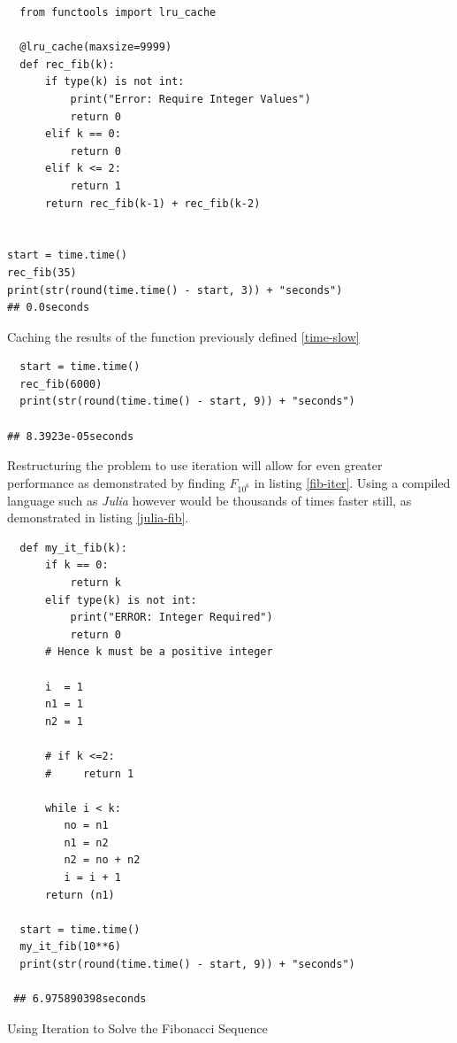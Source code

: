 \documentclass[11pt]{article}
\begin{document}
\begin{listing}[htbp]
\begin{verbatim}
  from functools import lru_cache

  @lru_cache(maxsize=9999)
  def rec_fib(k):
      if type(k) is not int:
          print("Error: Require Integer Values")
          return 0
      elif k == 0:
          return 0
      elif k <= 2:
          return 1
      return rec_fib(k-1) + rec_fib(k-2)


start = time.time()
rec_fib(35)
print(str(round(time.time() - start, 3)) + "seconds")
## 0.0seconds
\end{verbatim}
\caption{\label{fib-cache}Caching the results of the function previously defined \ref{time-slow}}
\end{listing}

\begin{verbatim}
  start = time.time()
  rec_fib(6000)
  print(str(round(time.time() - start, 9)) + "seconds")

## 8.3923e-05seconds
\end{verbatim}

Restructuring the problem to use iteration will allow for even greater performance as demonstrated by finding \(F_{10^{6}}\) in listing \ref{fib-iter}. Using a compiled language such as \emph{Julia} however would be thousands of times faster still, as demonstrated in listing \ref{julia-fib}.



\begin{listing}[htbp]
\begin{verbatim}
  def my_it_fib(k):
      if k == 0:
          return k
      elif type(k) is not int:
          print("ERROR: Integer Required")
          return 0
      # Hence k must be a positive integer

      i  = 1
      n1 = 1
      n2 = 1

      # if k <=2:
      #     return 1

      while i < k:
         no = n1
         n1 = n2
         n2 = no + n2
         i = i + 1
      return (n1)

  start = time.time()
  my_it_fib(10**6)
  print(str(round(time.time() - start, 9)) + "seconds")

 ## 6.975890398seconds
\end{verbatim}
\caption{\label{fib-iter}Using Iteration to Solve the Fibonacci Sequence}
\end{listing}
\end{document}
